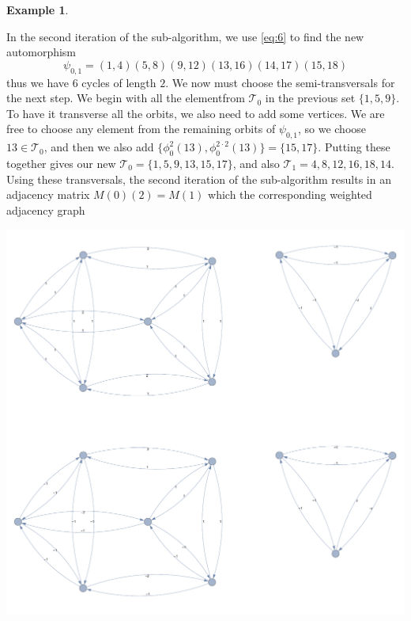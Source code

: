 \documentclass[preprint,12pt]{elsarticle}
\newcommand{\cT}{\mathcal{T}}
\theoremstyle{definition}
\newtheorem{example}[thm]{Example}
\theoremstyle{remark}
\begin{document}
\begin{example}
\begin{center}
\end{center}
In the second iteration of the sub-algorithm, we use \eqref{eq:6} to find the new automorphism $$\psi_{0,1}=(1,4)(5,8)(9,12)(13,16)(14,17)(15,18)$$ thus we have 6 cycles of length $2$. We now must choose the semi-transversals for the next step. We begin with all the elementfrom $\cT_0$ in the previous set $\{1,5,9\}$. To have it transverse all the orbits, we also need to add some vertices. We are free to choose any element from the remaining orbits of $\psi_{0,1}$, so we choose $13\in\cT_0$, and then we also add $\{\phi ^{2}_0(13),\phi ^{2\cdot 2}_0(13)\}=\{15,17\}$.  Putting these together gives our new $\cT_0=\{1,5,9,13,15,17\}$, and also $\cT_1={4,8,12,16,18,14}$.  Using these transversals, the second iteration of the sub-algorithm results in an adjacency matrix $M(0)(2)=M(1)$ which the corresponding weighted adjacency graph

\begin{center}
\includegraphics[scale=.3]{ex2_2.pdf}
\end{center}



\end{example}
\end{document}
